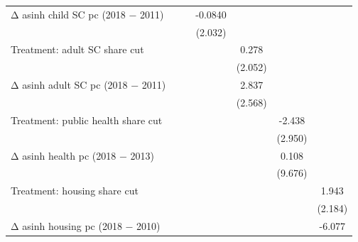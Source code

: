 \begin{table}[htbp]
\begin{tabular}{l*{6}{c}}
\addlinespace
Δ asinh child SC pc (2018 − 2011)&                     &                     &     -0.0840         &                     &                     &                     \\
                    &                     &                     &     (2.032)         &                     &                     &                     \\
\addlinespace
Treatment: adult SC share cut&                     &                     &                     &       0.278         &                     &                     \\
                    &                     &                     &                     &     (2.052)         &                     &                     \\
\addlinespace
Δ asinh adult SC pc (2018 − 2011)&                     &                     &                     &       2.837         &                     &                     \\
                    &                     &                     &                     &     (2.568)         &                     &                     \\
\addlinespace
Treatment: public health share cut&                     &                     &                     &                     &      -2.438         &                     \\
                    &                     &                     &                     &                     &     (2.950)         &                     \\
\addlinespace
Δ asinh health pc (2018 − 2013)&                     &                     &                     &                     &       0.108         &                     \\
                    &                     &                     &                     &                     &     (9.676)         &                     \\
\addlinespace
Treatment: housing share cut&                     &                     &                     &                     &                     &       1.943         \\
                    &                     &                     &                     &                     &                     &     (2.184)         \\
\addlinespace
Δ asinh housing pc (2018 − 2010)&                     &                     &                     &                     &                     &      -6.077\sym{***}\\

\end{tabular}
\end{table}
